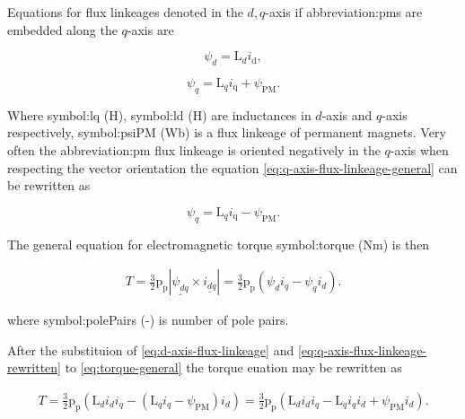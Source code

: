\documentclass[a4paper, twoside, 11pt]{article}
\begin{document}
        Equations for flux linkeages denoted in the $d,q$-axis if \gls{abbreviation:pm}s are embedded along the $q$-axis are

        \begin{equation}\label{eq:d-axis-flux-linkeage}
            \psi_d = \text{L}_d i_\text{d},
        \end{equation}

        \begin{equation}\label{eq:q-axis-flux-linkeage-general}
            \psi_q = \text{L}_q i_\text{q} + \psi_\text{PM}.
        \end{equation}

        Where \gls{symbol:lq} (H), \gls{symbol:ld} (H) are inductances in $d$-axis and $q$-axis respectively, \gls{symbol:psiPM} (Wb) is a flux linkeage of permanent magnets. Very often the \gls{abbreviation:pm} flux linkeage is oriented negatively in the $q$-axis when respecting the vector orientation the equation \ref{eq:q-axis-flux-linkeage-general} can be rewritten as

        \begin{equation}\label{eq:q-axis-flux-linkeage-rewritten}
            \psi_q = \text{L}_q i_\text{q} - \psi_\text{PM}.
        \end{equation}
        
        The general equation for electromagnetic torque \gls{symbol:torque} (Nm) is then

        \begin{equation}\label{eq:torque-general}
            \begin{gathered}
                T = \frac{3}{2} \text{p}_\text{p} | \underline{\psi_{dq}} \times \underline{i_{dq}} | = \frac{3}{2} \text{p}_\text{p} (\psi_d i_q - \psi_q i_d).
            \end{gathered}
        \end{equation}

        where \gls{symbol:polePairs} (-) is number of pole pairs.\par

        After the substituion of \ref{eq:d-axis-flux-linkeage} and \ref{eq:q-axis-flux-linkeage-rewritten} to \ref{eq:torque-general} the torque euation may be rewritten as


        \begin{equation}\label{eq:torque-pmsynrelm}
            \begin{gathered}
                T = \frac{3}{2} \text{p}_\text{p} (\text{L}_d i_d i_q - (\text{L}_q i_q -\psi_\text{PM}) i_d) = \frac{3}{2} \text{p}_\text{p} (\text{L}_d i_d i_q - \text{L}_q i_q i_d + \psi_\text{PM} i_d).
            \end{gathered}
        \end{equation}
\end{document}
